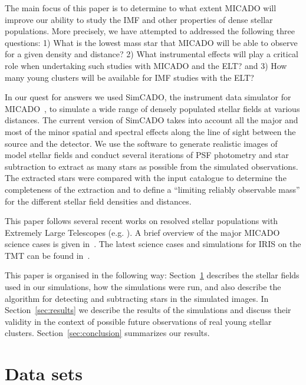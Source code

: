\documentclass{aa}
\begin{document}
The main focus of this paper is to determine to what extent MICADO will improve our ability to study the IMF and other properties of dense stellar populations.
More precisely, we have attempted to addressed the following three questions:
1) What is the lowest mass star that MICADO will be able to observe for a given density and distance?
2) What instrumental effects will play a critical role when undertaking such studies with MICADO and the ELT? and
3) How many young clusters will be available for IMF studies with the ELT?

In our quest for answers we used SimCADO, the instrument data simulator for MICADO~\citep{leschinski2016, leschinski19}, to simulate a wide range of densely populated stellar fields at various distances.
The current version of SimCADO takes into account all the major and most of the minor spatial and spectral effects along the line of sight between the source and the detector.
We use the software to generate realistic images of model stellar fields and  conduct several iterations of PSF photometry and star subtraction to extract as many stars as possible from the simulated observations.
The extracted stars were compared with the input catalogue to determine the completeness of the extraction and to define a ``limiting reliably observable mass'' for the different stellar field densities and distances.

This paper follows several recent works on resolved stellar populations with Extremely Large Telescopes
(e.g. \citealt{deep11, greggio12, gullieuszik15, tolstoy19_iau}).
A brief overview of the major MICADO science cases is given in~\cite{micado2016}.
The latest science cases and simulations for IRIS on the TMT can be found in~\cite{tmt_iris16}.

This paper is organised in the following way: Section~\ref{sec:observations} describes the stellar fields used in our simulations, how the simulations were run, and also describe the algorithm for detecting and subtracting stars in the simulated images.
In Section~\ref{sec:results} we describe the results of the simulations and discuss their validity in the context of possible future observations of real young stellar clusters.
Section~\ref{sec:conclusion} summarizes our results.



\section{Data sets}
\label{sec:observations}
\end{document}
